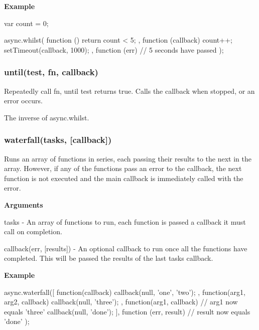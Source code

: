 {\bfseries Example} \begin{DoxyVerb}var count = 0;

async.whilst(
    function () { return count < 5; },
    function (callback) {
        count++;
        setTimeout(callback, 1000);
    },
    function (err) {
        // 5 seconds have passed
    }
);
\end{DoxyVerb}






\label{_until}%
 \subsubsection*{until(test, fn, callback)}

Repeatedly call fn, until test returns true. Calls the callback when stopped, or an error occurs.

The inverse of async.\+whilst.





\label{_waterfall}%
 \subsubsection*{waterfall(tasks, \mbox{[}callback\mbox{]})}

Runs an array of functions in series, each passing their results to the next in the array. However, if any of the functions pass an error to the callback, the next function is not executed and the main callback is immediately called with the error.

{\bfseries Arguments}


\begin{DoxyItemize}
\item tasks -\/ An array of functions to run, each function is passed a callback it must call on completion.
\item callback(err, \mbox{[}results\mbox{]}) -\/ An optional callback to run once all the functions have completed. This will be passed the results of the last task\textquotesingle{}s callback.
\end{DoxyItemize}

{\bfseries Example} \begin{DoxyVerb}async.waterfall([
    function(callback){
        callback(null, 'one', 'two');
    },
    function(arg1, arg2, callback){
        callback(null, 'three');
    },
    function(arg1, callback){
        // arg1 now equals 'three'
        callback(null, 'done');
    }
], function (err, result) {
   // result now equals 'done'    
});
\end{DoxyVerb}






